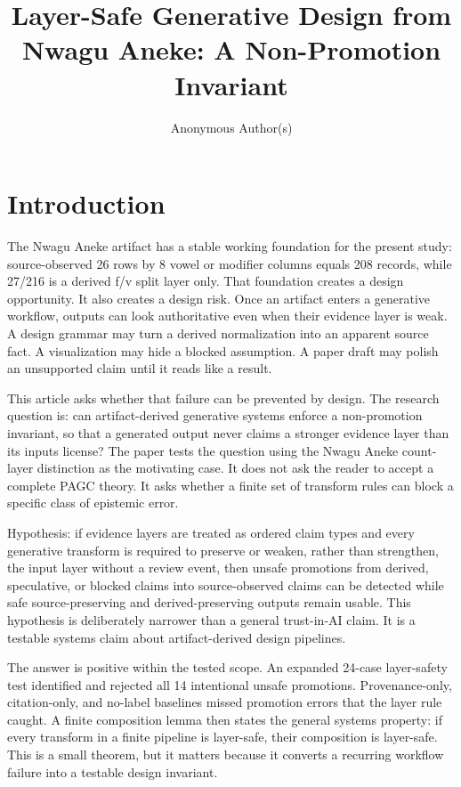\documentclass[sigconf,nonacm]{acmart}
\title{Layer-Safe Generative Design from Nwagu Aneke: A Non-Promotion Invariant}
\author{Anonymous Author(s)}
\affiliation{\institution{Independent research manuscript}\country{Nigeria}}
\begin{document}
\maketitle

\section{Introduction}
The Nwagu Aneke artifact has a stable working foundation for the present study:
source-observed 26 rows by 8 vowel or modifier columns equals 208 records, while
27/216 is a derived f/v split layer only. That foundation creates a design
opportunity. It also creates a design risk. Once an artifact enters a generative
workflow, outputs can look authoritative even when their evidence layer is weak.
A design grammar may turn a derived normalization into an apparent source fact.
A visualization may hide a blocked assumption. A paper draft may polish an
unsupported claim until it reads like a result.

This article asks whether that failure can be prevented by design. The
research question is: can artifact-derived generative systems enforce a non-promotion
invariant, so that a generated output never claims a stronger evidence layer
than its inputs license? The paper tests the question using the Nwagu Aneke
count-layer distinction as the motivating case. It does not ask the reader to
accept a complete PAGC theory. It asks whether a finite set of transform rules
can block a specific class of epistemic error.

Hypothesis: if evidence layers are treated as ordered claim types and every
generative transform is required to preserve or weaken, rather than strengthen,
the input layer without a review event, then unsafe promotions from derived,
speculative, or blocked claims into source-observed claims can be detected while
safe source-preserving and derived-preserving outputs remain usable. This
hypothesis is deliberately narrower than a general trust-in-AI claim. It is a
testable systems claim about artifact-derived design pipelines.

The answer is positive within the tested scope. An expanded 24-case
layer-safety test identified and rejected all 14 intentional unsafe promotions.
Provenance-only, citation-only, and no-label baselines missed promotion errors
that the layer rule caught. A finite composition lemma then states the general
systems property: if every transform
in a finite pipeline is layer-safe, their composition is layer-safe. This is a
small theorem, but it matters because it converts a recurring workflow failure into a
testable design invariant.
\end{document}
